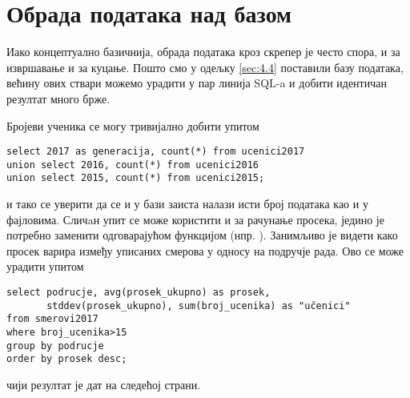 \section{Обрада података над базом}\label{ch:obradasql}

Иако концептуално базичнија, обрада података кроз скрепер је често спора, и за извршавање и за куцање. Пошто смо у одељку \ref{sec:4.4} поставили базу података, већину ових ствари можемо урадити у пар линија SQL-a и добити идентичан резултат много брже.

Бројеви ученика се могу тривијално добити упитом 
\begin{verbatim}
select 2017 as generacija, count(*) from ucenici2017 
union select 2016, count(*) from ucenici2016 
union select 2015, count(*) from ucenici2015;
\end{verbatim} 
и тако се уверити да се и у бази заиста налази исти број података као и у фајловима. Сличaн упит се може користити и за рачунање просека, једино је потребно заменити  одговарајућом функцијом (нпр. ). Занимљиво је видети како просек варира између уписаних смерова у односу на подручје рада. Ово се може урадити упитом
\begin{verbatim}
select podrucje, avg(prosek_ukupno) as prosek, 
       stddev(prosek_ukupno), sum(broj_ucenika) as "učenici"
from smerovi2017 
where broj_ucenika>15 
group by podrucje 
order by prosek desc;
\end{verbatim}
чији резултат је дат на следећој страни.

